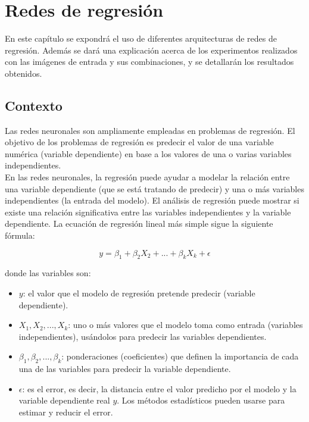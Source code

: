 \chapter{Redes de regresión}\label{cap.regresion}

En este capítulo se expondrá el uso de diferentes arquitecturas de redes de regresión. Además se dará una explicación acerca de los experimentos realizados con las imágenes de entrada y sus combinaciones, y se detallarán los resultados obtenidos.

\section{Contexto}

Las redes neuronales son ampliamente empleadas en problemas de regresión. El objetivo de los problemas de regresión es predecir el valor de una variable numérica (variable dependiente) en base a los valores de una o varias variables independientes.\\

En las redes neuronales, la regresión puede ayudar a modelar la relación entre una variable dependiente (que se está tratando de predecir) y una o más variables independientes (la entrada del modelo). El análisis de regresión puede mostrar si existe una relación significativa entre las variables independientes y la variable dependiente. La ecuación de regresión lineal más simple sigue la siguiente fórmula:

\[ y = \beta_{1} + \beta_{2} X_{2} + ... + \beta_{k} X_{k} + \epsilon  \]

donde las variables son:

\begin{itemize}
    \item \(y\): el valor que el modelo de regresión pretende predecir (variable dependiente).
    \item \(X_{1}, X_{2},... , X_{k}\): uno o más valores que el modelo toma como entrada (variables independientes), usándolos para predecir las variables dependientes.
    \item \(\beta_{1}, \beta_{2},... , \beta_{k}\): ponderaciones (coeficientes) que definen la importancia de cada una de las variables para predecir la variable dependiente.
    \item \(\epsilon\): es el error, es decir, la distancia entre el valor predicho por el modelo y la variable dependiente real \(y\). Los métodos estadísticos pueden usarse para estimar y reducir el  error.
\end{itemize}

